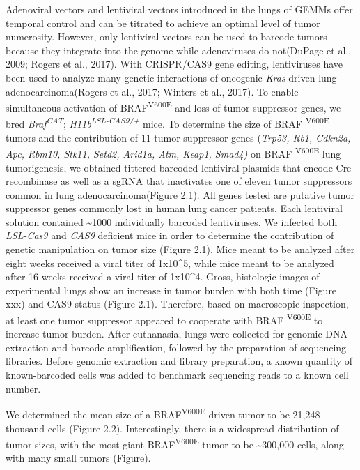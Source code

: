 Adenoviral vectors and lentiviral vectors introduced in the lungs of GEMMs offer temporal control and can be titrated to achieve an optimal level of tumor numerosity.
However, only lentiviral vectors can be used to barcode tumors because they integrate into the genome while adenoviruses do not(DuPage et al., 2009; Rogers et al., 2017).
With CRISPR/CAS9 gene editing, lentiviruses have been used to analyze many genetic interactions of oncogenic \emph{Kras} driven lung adenocarcinoma(Rogers et al., 2017; Winters et al., 2017).
To enable simultaneous activation of BRAF\textsuperscript{V600E} and loss of tumor suppressor genes, we bred \emph{Braf\textsuperscript{CAT}}; \emph{H11b\textsuperscript{LSL-CAS9/+}} mice.
To determine the size of BRAF \textsuperscript{V600E} tumors and the contribution of 11 tumor suppressor genes (\emph{Trp53, Rb1, Cdkn2a, Apc, Rbm10, Stk11, Setd2, Arid1a, Atm, Keap1, Smad4)} on BRAF \textsuperscript{V600E} lung tumorigenesis, we obtained tittered barcoded-lentiviral plasmids that encode Cre-recombinase as well as a sgRNA that inactivates one of eleven tumor suppressors common in lung adenocarcinoma(Figure 2.1).
All genes tested are putative tumor suppressor genes commonly lost in human lung cancer patients. Each lentiviral solution contained \textasciitilde1000 individually barcoded lentiviruses.
We infected both \emph{LSL-Cas9} and \emph{CAS9} deficient mice in order to determine the contribution of genetic manipulation on tumor size (Figure 2.1).
Mice meant to be analyzed after eight weeks received a viral titer of 1x10\^{}5, while mice meant to be analyzed after 16 weeks received a viral titer of 1x10\^{}4.
Gross, histologic images of experimental lungs show an increase in tumor burden with both time (Figure xxx) and CAS9 status (Figure 2.1).
Therefore, based on macroscopic inspection, at least one tumor suppressor appeared to cooperate with BRAF \textsuperscript{V600E} to increase tumor burden.
After euthanasia, lungs were collected for genomic DNA extraction and barcode amplification, followed by the preparation of sequencing libraries.
Before genomic extraction and library preparation, a known quantity of known-barcoded cells was added to benchmark sequencing reads to a known cell number.

We determined the mean size of a BRAF\textsuperscript{V600E} driven tumor to be 21,248 thousand cells (Figure 2.2).
Interestingly, there is a widespread distribution of tumor sizes, with the most giant BRAF\textsuperscript{V600E} tumor to be \textasciitilde300,000 cells, along with many small tumors (Figure).

